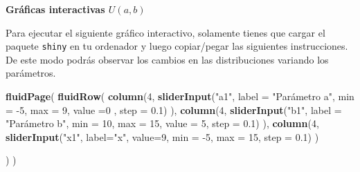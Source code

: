 \documentclass[]{book}
\newenvironment{Shaded}{\begin{snugshade}}{\end{snugshade}}
\newcommand{\DataTypeTok}[1]{\textcolor[rgb]{0.13,0.29,0.53}{#1}}
\newcommand{\DecValTok}[1]{\textcolor[rgb]{0.00,0.00,0.81}{#1}}
\newcommand{\FloatTok}[1]{\textcolor[rgb]{0.00,0.00,0.81}{#1}}
\newcommand{\KeywordTok}[1]{\textcolor[rgb]{0.13,0.29,0.53}{\textbf{#1}}}
\newcommand{\NormalTok}[1]{#1}
\newcommand{\StringTok}[1]{\textcolor[rgb]{0.31,0.60,0.02}{#1}}
\begin{document}
\textbf{Gráficas interactivas \(U(a,b)\)}

Para ejecutar el siguiente gráfico interactivo, solamente tienes que cargar el paquete \texttt{shiny} en tu ordenador y luego copiar/pegar las siguientes instrucciones. De este modo podrás observar los cambios en las distribuciones variando los parámetros.

\begin{Shaded}
\begin{Highlighting}[]
\KeywordTok{fluidPage}\NormalTok{(}
\KeywordTok{fluidRow}\NormalTok{(}
  \KeywordTok{column}\NormalTok{(}\DecValTok{4}\NormalTok{,}
         \KeywordTok{sliderInput}\NormalTok{(}\StringTok{"a1"}\NormalTok{, }\DataTypeTok{label =} \StringTok{"Parámetro a"}\NormalTok{,}
              \DataTypeTok{min =} \DecValTok{-5}\NormalTok{, }\DataTypeTok{max =} \DecValTok{9}\NormalTok{, }\DataTypeTok{value =}\DecValTok{0}\NormalTok{ , }\DataTypeTok{step =} \FloatTok{0.1}\NormalTok{)}
\NormalTok{         ),}
  \KeywordTok{column}\NormalTok{(}\DecValTok{4}\NormalTok{,}
          \KeywordTok{sliderInput}\NormalTok{(}\StringTok{"b1"}\NormalTok{, }\DataTypeTok{label =} \StringTok{"Parámetro b"}\NormalTok{,}
                     \DataTypeTok{min =} \DecValTok{10}\NormalTok{, }\DataTypeTok{max =} \DecValTok{15}\NormalTok{, }\DataTypeTok{value =} \DecValTok{5}\NormalTok{, }\DataTypeTok{step =} \FloatTok{0.1}\NormalTok{)}
\NormalTok{         ),}
  \KeywordTok{column}\NormalTok{(}\DecValTok{4}\NormalTok{,}
         \KeywordTok{sliderInput}\NormalTok{(}\StringTok{"x1"}\NormalTok{, }\DataTypeTok{label=}\StringTok{"x"}\NormalTok{, }\DataTypeTok{value=}\DecValTok{9}\NormalTok{, }\DataTypeTok{min =} \DecValTok{-5}\NormalTok{, }\DataTypeTok{max =} \DecValTok{15}\NormalTok{, }\DataTypeTok{step =} \FloatTok{0.1}\NormalTok{)}
\NormalTok{         )}
  
\NormalTok{)}
\NormalTok{)}


\end{Highlighting}
\end{Shaded}
\end{document}
